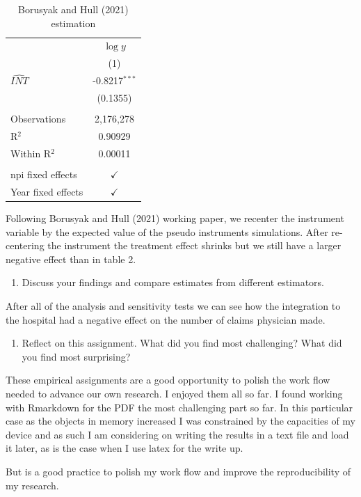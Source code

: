 \documentclass[
  12pt,
]{article}
\providecommand{\tightlist}{%
  \setlength{\itemsep}{0pt}\setlength{\parskip}{0pt}}
\begin{document}
\begin{table}[ht]
\centering
\begin{tabular}{lc}
     \toprule
                        & $\log y$\\   
                        & (1)\\  
     \midrule 
     $\hat{INT}$             & -0.8217$^{***}$\\   
                        & (0.1355)\\   
      \\
     Observations       & 2,176,278\\  
     R$^2$              & 0.90929\\  
     Within R$^2$       & 0.00011\\  
      \\
     npi fixed effects  & $\checkmark$\\   
     Year fixed effects & $\checkmark$\\   
     \bottomrule
  \end{tabular}
\caption{ Borusyak and Hull (2021)  estimation} 
\label{tab:ci}
\end{table}

Following Borusyak and Hull (2021) working paper, we recenter the
instrument variable by the expected value of the pseudo instruments
simulations. After re-centering the instrument the treatment effect
shrinks but we still have a larger negative effect than in table 2.

\begin{enumerate}
\def\labelenumi{\arabic{enumi}.}
\setcounter{enumi}{8}
\tightlist
\item
  Discuss your findings and compare estimates from different estimators.
\end{enumerate}

After all of the analysis and sensitivity tests we can see how the
integration to the hospital had a negative effect on the number of
claims physician made.

\begin{enumerate}
\def\labelenumi{\arabic{enumi}.}
\setcounter{enumi}{9}
\tightlist
\item
  Reflect on this assignment. What did you find most challenging? What
  did you find most surprising?
\end{enumerate}

These empirical assignments are a good opportunity to polish the work
flow needed to advance our own research. I enjoyed them all so far. I
found working with Rmarkdown for the PDF the most challenging part so
far. In this particular case as the objects in memory increased I was
constrained by the capacities of my device and as such I am considering
on writing the results in a text file and load it later, as is the case
when I use latex for the write up.

But is a good practice to polish my work flow and improve the
reproducibility of my research.
\end{document}
